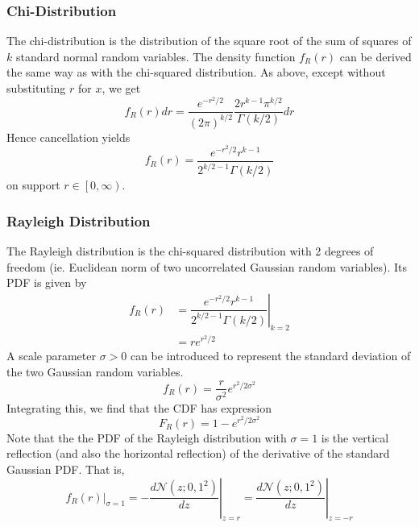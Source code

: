 \documentclass[11pt]{report} %
\begin{document}
\subsubsection{Chi-Distribution}

The chi-distribution is the distribution of the square root of the sum of squares of $k$ standard normal random variables. The density function $f_{R}\left(r\right)$ can be derived the same way as with the chi-squared distribution. As above, except without substituting $r$ for $x$, we get
\begin{equation}
f_{R}\left(r\right)dr = \dfrac{e^{-r^{2}/2}}{\left(2\pi\right)^{k/2}}\dfrac{2r^{k-1}\pi^{k/2}}{\Gamma\left(k/2\right)}dr
\end{equation}
Hence cancellation yields
\begin{equation}
f_{R}\left(r\right) = \dfrac{e^{-r^{2}/2}r^{k - 1}}{2^{k/2 - 1}\Gamma\left(k/2\right)}
\end{equation}
on support $r \in \left[0, \infty\right)$.

\subsubsection{Rayleigh Distribution}

The Rayleigh distribution is the chi-squared distribution with 2 degrees of freedom (ie. Euclidean norm of two uncorrelated Gaussian random variables). Its PDF is given by
\begin{align}
f_{R}\left(r\right) &= \left.\dfrac{e^{-r^{2}/2}r^{k - 1}}{2^{k/2 - 1}\Gamma\left(k/2\right)}\right|_{k = 2}  \\
&= re^{r^{2}/2}
\end{align}
A scale parameter $\sigma > 0$  can be introduced to represent the standard deviation of the two Gaussian random variables.
\begin{equation}
f_{R}\left(r\right) = \dfrac{r}{\sigma^{2}}e^{r^{2}/2\sigma^{2}}
\end{equation}
Integrating this, we find that the CDF has expression
\begin{equation}
F_{R}\left(r\right) = 1 - e^{r^{2}/2\sigma^{2}}
\end{equation}
Note that the the PDF of the Rayleigh distribution with $\sigma = 1$ is the vertical reflection (and also the horizontal reflection) of the derivative of the standard Gaussian PDF. That is,
\begin{equation}
\left.f_{R}\left(r\right)\right|_{\sigma = 1} = -\left.\dfrac{d\mathcal{N}\left(z; 0, 1^{2}\right)}{dz}\right|_{z = r} = \left.\dfrac{d\mathcal{N}\left(z; 0, 1^{2}\right)}{dz}\right|_{z = -r}
\end{equation}
\end{document}

